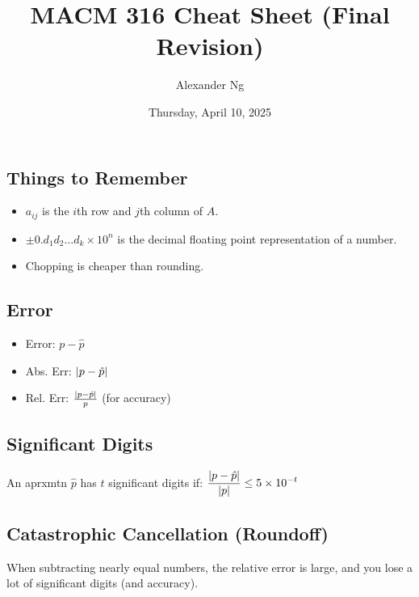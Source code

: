 \documentclass[8pt, letterpaper]{extarticle}
\begin{document}
\title{MACM 316 Cheat Sheet (Final Revision)}
\author{Alexander Ng}
\date{Thursday, April 10, 2025}


\begin{multicols*}{3}
  \section{Things to Remember}
  \begin{itemize}
    \item $a_{ij}$ is the $i$th row and $j$th column of $A$.
    \item $\pm 0.d_1d_2\dots d_k \times 10^n$ is the decimal floating point 
      representation of a number.
    \item Chopping is cheaper than rounding.
  \end{itemize}

  \subsection{Error}
  \begin{itemize} %
    \item Error: $p - \hat{p}$
    \item Abs. Err: $\abs{p - \hat{p}}$
    \item Rel. Err: $\frac{\abs{p - \hat{p}}}{p}$ (for accuracy)
  \end{itemize}

  \subsection{Significant Digits}
  An aprxmtn $\hat p$ has $t$ significant digits if:
  $\displaystyle \frac{\abs{p-\hat p}}{\abs{p}} \leq 5 \times 10^{-t}$

  \subsection{Catastrophic Cancellation (Roundoff)}
  When subtracting nearly equal numbers, the relative error is large, and you
  lose a lot of significant digits (and accuracy).


\end{multicols*}
\end{document}
